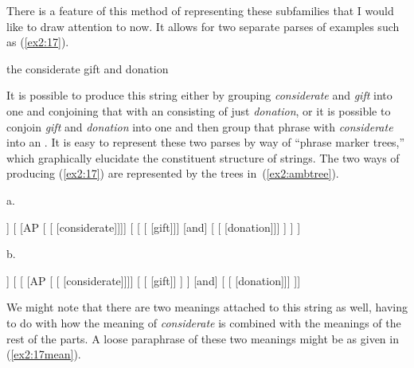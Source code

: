 There is a feature of this method of representing these subfamilies that I would like to draw attention to now. It allows for two separate parses of examples such as (\ref{ex2:17}).
\begin{exe}
	\ex \label{ex2:17} the considerate gift and donation
\end{exe}
It is possible to produce this string either by grouping \emph{considerate} and \emph{gift} into one  and conjoining that with an  consisting of just \emph{donation}, or it is possible to conjoin \emph{gift} and \emph{donation} into one  and then group that phrase with \emph{considerate} into an . It is easy to represent these two parses by way of ``phrase marker trees,'' which graphically elucidate the constituent structure of strings. The two ways of producing (\ref{ex2:17}) are represented by the trees in~(\ref{ex2:ambtree}).
\begin{exe}
\ex \label{ex2:ambtree}
	a.\hspace{5pt}
	\small
\begin{forest}
[NP
	[\obar{D} [the]]
	[ 
		[AP [ [ [considerate]]]]
		[ 
			[ [ [gift]]]
			[and]
			[ [ [donation]]]
		]
	]
]
\end{forest}
\hspace*{15pt}
	b. \hspace{5pt}
\begin{forest}
[NP
	[\obar{D} [the]]
	[
	[ 
		[AP [ [ [considerate]]]]
		[ [ [gift]] ]
	]
	[and]
	[ [ [donation]]]
]]
\end{forest}
\end{exe}
We might note that there are two meanings attached to this string as well, having to do with how the meaning of \emph{considerate} is combined with the meanings of the rest of the parts. A loose paraphrase of these two meanings might be as given in (\ref{ex2:17mean}).%
